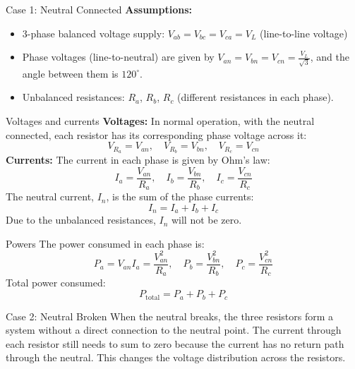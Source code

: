 \begin{frame}{Case 1: Neutral Connected}
    \textbf{Assumptions:}
    \begin{itemize}
        \item 3-phase balanced voltage supply: $V_{ab} = V_{bc} = V_{ca} = V_L$ (line-to-line voltage)
        \item Phase voltages (line-to-neutral) are given by $V_{an} = V_{bn} = V_{cn} = \frac{V_L}{\sqrt{3}}$, and the angle between them is $120^\circ$.
        \item Unbalanced resistances: $R_a$, $R_b$, $R_c$ (different resistances in each phase).
    \end{itemize}
\end{frame}
\begin{frame}{Voltages and currents}
    \textbf{Voltages:} In normal operation, with the neutral connected, each resistor has its corresponding phase voltage across it:
    $$V_{R_a} = V_{an}, \quad V_{R_b} = V_{bn}, \quad V_{R_c} = V_{cn}$$
    \textbf{Currents:} The current in each phase is given by Ohm's law:
    $$I_a = \frac{V_{an}}{R_a}, \quad I_b = \frac{V_{bn}}{R_b}, \quad I_c = \frac{V_{cn}}{R_c}$$
    The neutral current, $I_n$, is the sum of the phase currents:
    $$I_n = I_a + I_b + I_c$$
    Due to the unbalanced resistances, $I_n$ will not be zero.
\end{frame}

\begin{frame}{Powers}
    The power consumed in each phase is:
    $$P_a = V_{an} I_a = \frac{V_{an}^2}{R_a}, \quad P_b = \frac{V_{bn}^2}{R_b}, \quad P_c = \frac{V_{cn}^2}{R_c}$$
    Total power consumed:
    $$P_{\text{total}} = P_a + P_b + P_c$$
\end{frame}

\begin{frame}{Case 2: Neutral Broken}
    When the neutral breaks, the three resistors form a system without a direct connection to the neutral point. The current through each resistor still needs to sum to zero because the current has no return path through the neutral. This changes the voltage distribution across the resistors.
\end{frame}

